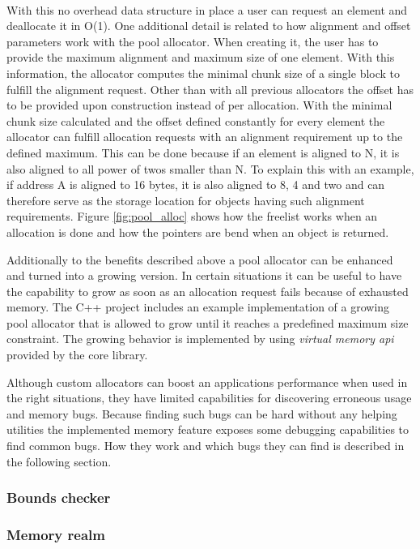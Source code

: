 \noindent
\\
With this no overhead data structure in place a user can request an element and deallocate it in O(1). One additional detail is related to how alignment and offset parameters work with the pool allocator. When creating it, the user has to provide the maximum alignment and maximum size of one element. With this information, the allocator computes the minimal chunk size of a single block to fulfill the alignment request. Other than with all previous allocators the offset has to be provided upon construction instead of per allocation. With the minimal chunk size calculated and the offset defined constantly for every element the allocator can fulfill allocation requests with an alignment requirement up to the defined maximum. This can be done because if an element is aligned to N, it is also aligned to all power of twos smaller than N. To explain this with an example, if address A is aligned to 16 bytes, it is also aligned to 8, 4 and two and can therefore serve as the storage location for objects having such alignment requirements. Figure \ref{fig:pool_alloc} shows how the freelist works when an allocation is done and how the pointers are bend when an object is returned.

Additionally to the benefits described above a pool allocator can be enhanced and turned into a growing version. In certain situations it can be useful to have the capability to grow as soon as an allocation request fails because of exhausted memory. The C++ project includes an example implementation of a growing pool allocator that is allowed to grow until it reaches a predefined maximum size constraint. The growing behavior is implemented by using \textit{virtual memory api} provided by the core library.

Although custom allocators can boost an applications performance when used in the right situations, they have limited capabilities for discovering erroneous usage and memory bugs. Because finding such bugs can be hard without any helping utilities the implemented memory feature exposes some debugging capabilities to find common bugs. How they work and which bugs they can find is described in the following section.

\subsubsection{Bounds checker}
\blindtext

\subsubsection{Memory realm}
\blindtext

